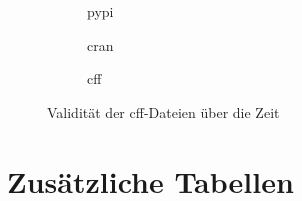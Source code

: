 \begin{figure}[H]
    \begin{subfigure}{.5\textwidth}
        \centering
        
        \caption{\gls{pypi}}
        \label{fig:valid_cff_by_time_pypi}
    \end{subfigure}%
    \begin{subfigure}{.5\textwidth}
        \centering
        
        \caption{\gls{cran}}
        \label{fig:valid_cff_by_time_cran}
    \end{subfigure}
    \centering
    \begin{subfigure}{.5\textwidth}
        \centering
        
        \caption{\gls{cff}}
        \label{fig:valid_cff_by_time_cff}
    \end{subfigure}
    \caption{Validität der \gls{cff}-Dateien über die Zeit}
    \label{fig:valid_cff_by_time_anhang}
\end{figure}

\chapter{Zusätzliche Tabellen}
\label{chap:zusaetzliche_tabellen}

